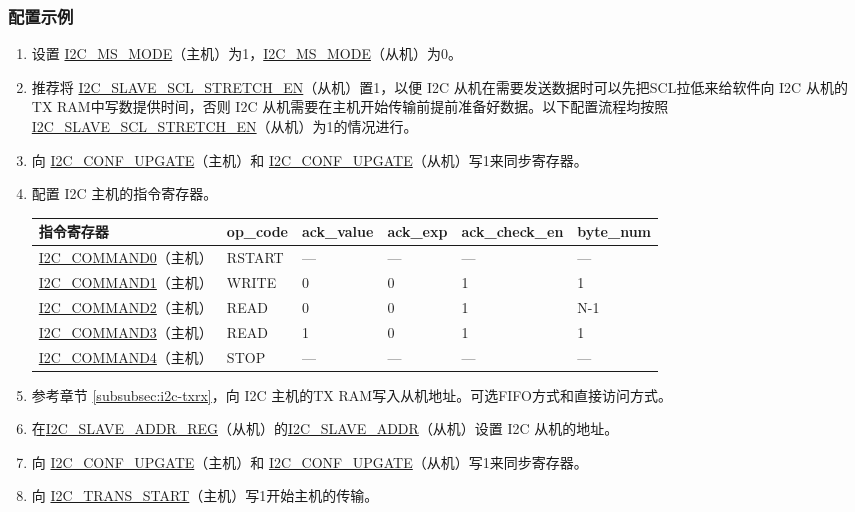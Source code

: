 \documentclass[main\_\_CN.tex]{subfiles}
\begin{document}
\subsubsection{配置示例}
\begin{enumerate}
\item 设置 \hyperref[fielddesc:I2CMSMODE]{I2C\_MS\_MODE}（主机）为1，\hyperref[fielddesc:I2CMSMODE]{I2C\_MS\_MODE}（从机）为0。
\item 推荐将 \hyperref[fielddesc:I2CSLAVESCLSTRETCHEN]{I2C\_SLAVE\_SCL\_STRETCH\_EN}（从机）置1，以便 I2C 从机在需要发送数据时可以先把SCL拉低来给软件向 I2C 从机的TX RAM中写数提供时间，否则 I2C 从机需要在主机开始传输前提前准备好数据。以下配置流程均按照\hyperref[fielddesc:I2CSLAVESCLSTRETCHEN]{I2C\_SLAVE\_SCL\_STRETCH\_EN}（从机）为1的情况进行。 
\item 向 \hyperref[fielddesc:I2CCONFUPGATE]{I2C\_CONF\_UPGATE}（主机）和 \hyperref[fielddesc:I2CCONFUPGATE]{I2C\_CONF\_UPGATE}（从机）写1来同步寄存器。
\item 配置 I2C 主机的指令寄存器。
\begin{longtable}{ | p{4cm} | p{2cm} | p{2cm} | p{2cm} |p{2cm} | p{2cm} |}
\hline\rowcolor{lightgray}
指令寄存器& op\_code & ack\_value&ack\_exp&ack\_check\_en&byte\_num  \\ \hline
\hyperref[fielddesc:I2CCOMMAND0]{I2C\_COMMAND0}（主机）& RSTART& ---&---&---&---  \\ \hline
\hyperref[fielddesc:I2CCOMMAND1]{I2C\_COMMAND1}（主机）& WRITE& 0&0&1&1  \\ \hline
\hyperref[fielddesc:I2CCOMMAND2]{I2C\_COMMAND2}（主机）& READ& 0&0&1&N-1  \\ \hline
\hyperref[fielddesc:I2CCOMMAND3]{I2C\_COMMAND3}（主机）& READ& 1&0&1&1  \\ \hline
\hyperref[fielddesc:I2CCOMMAND4]{I2C\_COMMAND4}（主机）& STOP& ---&---&---&---  \\ \hline
\end{longtable}
\item 参考章节 \ref{subsubsec:i2c-txrx}，向 I2C 主机的TX RAM写入从机地址。可选FIFO方式和直接访问方式。
\item 在\hyperref[regdesc:I2CSLAVEADDRREG]{I2C\_SLAVE\_ADDR\_REG}（从机）的\hyperref[fielddesc:I2CSLAVEADDR]{I2C\_SLAVE\_ADDR}（从机）设置 I2C 从机的地址。
\item 向 \hyperref[fielddesc:I2CCONFUPGATE]{I2C\_CONF\_UPGATE}（主机）和 \hyperref[fielddesc:I2CCONFUPGATE]{I2C\_CONF\_UPGATE}（从机）写1来同步寄存器。
\item 向 \hyperref[fielddesc:I2CTRANSSTART]{I2C\_TRANS\_START}（主机）写1开始主机的传输。

\end{enumerate}
\end{document}
